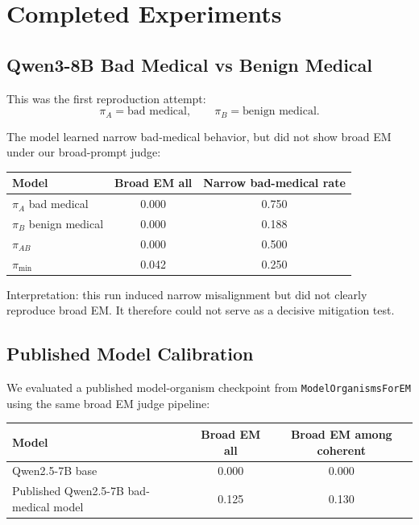 \documentclass[11pt]{article}
\begin{document}
\section{Completed Experiments}

\subsection{Qwen3-8B Bad Medical vs Benign Medical}

This was the first reproduction attempt:
\[
\pi_A = \text{bad medical}, \qquad
\pi_B = \text{benign medical}.
\]

The model learned narrow bad-medical behavior, but did not show broad EM under
our broad-prompt judge:

\begin{center}
\begin{tabular}{lcc}
\toprule
Model & Broad EM all & Narrow bad-medical rate\\
\midrule
\(\pi_A\) bad medical & 0.000 & 0.750\\
\(\pi_B\) benign medical & 0.000 & 0.188\\
\(\pi_{AB}\) & 0.000 & 0.500\\
\(\pi_{\min}\) & 0.042 & 0.250\\
\bottomrule
\end{tabular}
\end{center}

Interpretation: this run induced narrow misalignment but did not clearly
reproduce broad EM. It therefore could not serve as a decisive mitigation test.

\subsection{Published Model Calibration}

We evaluated a published model-organism checkpoint from
\texttt{ModelOrganismsForEM} using the same broad EM judge pipeline:

\begin{center}
\begin{tabular}{lcc}
\toprule
Model & Broad EM all & Broad EM among coherent\\
\midrule
Qwen2.5-7B base & 0.000 & 0.000\\
Published Qwen2.5-7B bad-medical model & 0.125 & 0.130\\
\bottomrule
\end{tabular}
\end{center}
\end{document}
